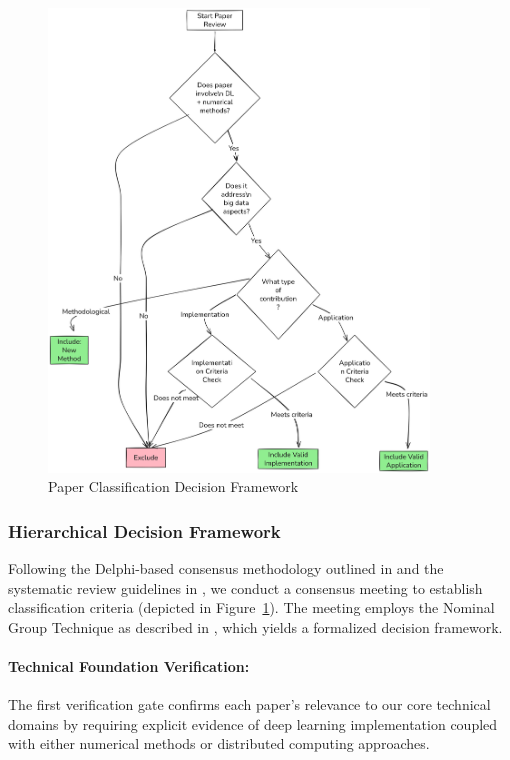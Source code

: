 \documentclass[acmsmall]{acmart}
\begin{document}
\begin{figure}[h]
    \centering
    \includegraphics[width=0.9\textwidth]{media/Company Structure.png}
    \caption{Paper Classification Decision Framework}
    \label{fig:decision-flow2}
\end{figure}

\subsubsection{Hierarchical Decision Framework}\label{subsubsec:phase-2-literature-search-and-study-selection:hierarchical-decision-framework}
Following the Delphi-based consensus methodology outlined in \citet{dalkey1969delphi} and the systematic review guidelines in  \citet{kitchenham2004procedures}, we conduct a  consensus meeting to establish classification criteria (depicted in Figure~\ref{fig:decision-flow2}). The meeting employs the Nominal Group Technique as described in \citet{delbecq1971group}, which yields a formalized decision framework.

\paragraph{Technical Foundation Verification:}
The first verification gate confirms each paper's relevance to our core technical domains by requiring explicit evidence of deep learning implementation coupled with either numerical methods or distributed computing approaches.
\end{document}
